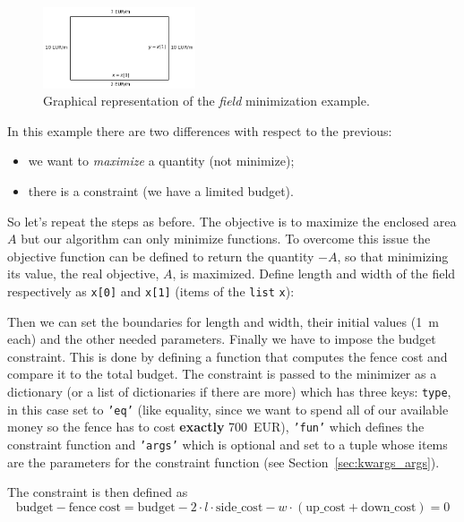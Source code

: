 \begin{figure}[ht]
\centering
\includegraphics[width=0.4\textwidth]{figures/field.png}
\caption{Graphical representation of the \emph{field} minimization example.}
\label{fig:field}
\end{figure}

In this example there are two differences with respect to the previous:

\begin{itemize}
\tightlist
\item we want to \emph{maximize} a quantity (not minimize);
\item there is a constraint (we have a limited budget).
\end{itemize}


So let's repeat the steps as before. The objective is to maximize the enclosed area $A$ but our algorithm can only minimize functions. To overcome this issue the objective function can be defined to return the quantity $-A$, so that minimizing its value, the real objective, $A$, is maximized. 
Define length and width of the field respectively as \texttt{x[0]} and \texttt{x[1]} (items of the \texttt{list} \texttt{x}):

Then we can set the boundaries for length and width, their initial values (1~m each) and the other needed parameters.
Finally we have to impose the budget constraint. This is done by defining a function that computes the fence cost and compare it to the total budget. 
The constraint is passed to the minimizer as a dictionary (or a list  of dictionaries if there are more) which has three keys: \texttt{type}, in this case set to \texttt{'eq'} (like equality, since we want to spend all of our available money so the fence has to cost \textbf{exactly} 700~EUR), \texttt{'fun'} which defines the constraint function and \texttt{'args'} which is optional and set to a tuple whose items are the parameters for the constraint function (see Section~\ref{sec:kwargs_args}).

The constraint is then defined as
\begin{equation*}
\mathrm{budget} - \mathrm{fence~cost} = \mathrm{budget} - 2\cdot l\cdot\mathrm{side\_cost} - w\cdot(\mathrm{up\_cost} + \mathrm{down\_cost}) = 0
\end{equation*}

